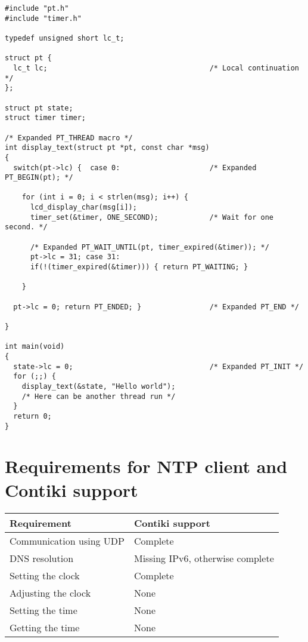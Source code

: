 \begin{lstlisting}
#include "pt.h"
#include "timer.h"

typedef unsigned short lc_t;

struct pt {
  lc_t lc;                                      /* Local continuation */
}; 

struct pt state;
struct timer timer;
 
/* Expanded PT_THREAD macro */
int display_text(struct pt *pt, const char *msg)
{
  switch(pt->lc) {  case 0:                     /* Expanded PT_BEGIN(pt); */
  
    for (int i = 0; i < strlen(msg); i++) {
      lcd_display_char(msg[i]);
      timer_set(&timer, ONE_SECOND);            /* Wait for one second. */
    
      /* Expanded PT_WAIT_UNTIL(pt, timer_expired(&timer)); */
      pt->lc = 31; case 31:                     
      if(!(timer_expired(&timer))) { return PT_WAITING; }
    
    }
  
  pt->lc = 0; return PT_ENDED; }                /* Expanded PT_END */
  
}

int main(void)
{
  state->lc = 0;                                /* Expanded PT_INIT */
  for (;;) {
    display_text(&state, "Hello world");
    /* Here can be another thread run */
  }
  return 0;
}

\end{lstlisting}



\chapter{Requirements for NTP client and Contiki support}\label{app:requirements}
\begin{tabular}{|l|l|}
	\hline
	Requirement & Contiki support \\ \hline
	Communication using UDP & Complete \\
	DNS resolution & Missing IPv6, otherwise complete \\
	Setting the clock & Complete \\
	Adjusting the clock & None \\
	Setting the time & None \\
	Getting the time & None \\
	\hline
\end{tabular}

